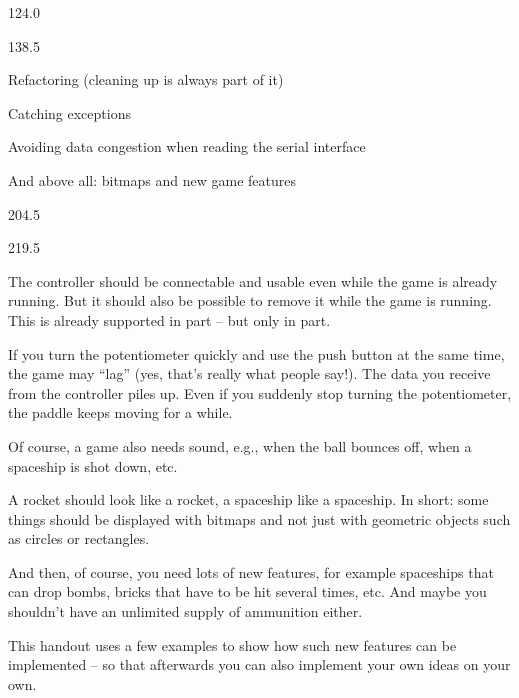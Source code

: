 \documentclass{aslab}
\begin{document}
\maketitleblock

\begin{region}{124.0}
\end{region}

\begin{region}[pitch=13]{138.5}
{\bfseries\color{aslabblue}
\begin{dashlist}
\item Refactoring (cleaning up is always part of it)
\item Catching exceptions
\item Avoiding data congestion when reading the serial interface
\item And above all: bitmaps and new game features
\end{dashlist}\par}
\end{region}

\begin{region}{204.5}
\end{region}

\begin{region}[pitch=13.2]{219.5}
\begin{dashlist}
\item The controller should be connectable and usable even while the game
  is already running. But it should also be possible to remove it while the
  game is running. This is already supported in part -- but only in part.
\item If you turn the potentiometer quickly and use the push button at the
  same time, the game may ``lag'' (yes, that's really what people say!). The
  data you receive from the controller piles up. Even if you suddenly stop
  turning the potentiometer, the paddle keeps moving for a while.
\item Of course, a game also needs sound, e.g., when the ball bounces off,
  when a spaceship is shot down, etc.
\item A rocket should look like a rocket, a spaceship like a spaceship. In
  short: some things should be displayed with bitmaps and not just with
  geometric objects such as circles or rectangles.
\item And then, of course, you need lots of new features, for example
  spaceships that can drop bombs, bricks that have to be hit several times,
  etc. And maybe you shouldn't have an unlimited supply of ammunition
  either.
\item This handout uses a few examples to show how such new features can be
  implemented -- so that afterwards you can also implement your own ideas
  on your own.
\end{dashlist}
\end{region}
\end{document}

